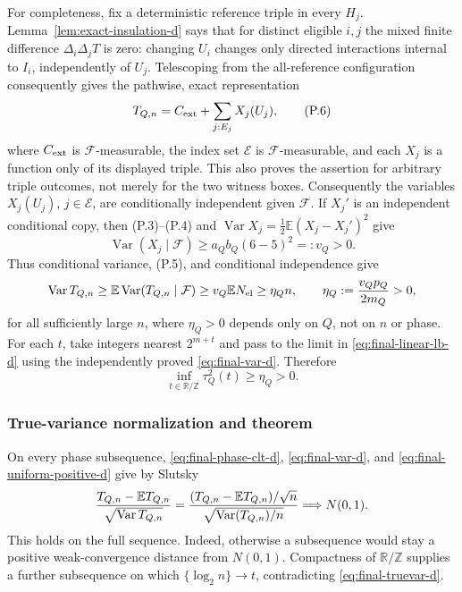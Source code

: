 \documentclass[11pt]{article}
\numberwithin{equation}{section}
\newcommand{\E}{\mathbb E}\newcommand{\Pp}{\mathbb P}
\newcommand{\Var}{\operatorname{Var}}\newcommand{\Cov}{\operatorname{Cov}}
\newcommand{\1}{\mathbf 1}\newcommand{\F}{\mathcal F}\newcommand{\D}{\mathcal D}
\begin{document}
For completeness, fix a deterministic reference triple in every $H_j$.
Lemma~\ref{lem:exact-insulation-d} says that for distinct eligible $i,j$ the
mixed finite difference $\Delta_i\Delta_jT$ is zero: changing $U_i$ changes
only directed interactions internal to $I_i$, independently of $U_j$.
Telescoping from the all-reference configuration consequently gives the
pathwise, exact representation
\begin{equation}
 T_{Q,n}=C_{\rm ext}+\sum_{j:E_j}X_j(U_j),              \tag{P.6}
\end{equation}
where $C_{\rm ext}$ is $\mathcal F$-measurable, the index set
$\mathcal E$ is $\mathcal F$-measurable, and each $X_j$ is a function only
of its displayed triple.  This also proves the assertion for arbitrary
triple outcomes, not merely for the two witness boxes.  Consequently the variables $X_j(U_j)$, $j\in\mathcal E$, are conditionally independent given $\mathcal F$.  If $X_j'$ is an independent conditional copy,
then (P.3)--(P.4) and
$\Var X_j=\frac12\E(X_j-X_j')^2$ give
\[
 \Var(X_j\mid\mathcal F)\ge a_Qb_Q(6-5)^2=:v_Q>0.      \tag{P.7}
\]
Thus conditional variance, (P.5), and conditional independence give
\begin{equation}
 \Var T_{Q,n}\ge\E\Var(T_{Q,n}\mid\mathcal F)
 \ge v_Q\E N_{\rm el}\ge\eta_Qn,\qquad
 \eta_Q:={v_Qp_Q\over2m_Q}>0,                          \label{eq:final-linear-lb-d}
\end{equation}
for all sufficiently large $n$, where $\eta_Q>0$ depends only on $Q$, not
on $n$ or phase.  For each $t$, take integers nearest $2^{m+t}$ and pass to
the limit in \eqref{eq:final-linear-lb-d} using the independently proved
\eqref{eq:final-var-d}.  Therefore
\begin{equation}\inf_{t\in\mathbb R/\mathbb Z}\tau_Q^2(t)\ge\eta_Q>0.
                                                               \label{eq:final-uniform-positive-d}
\end{equation}

\subsubsection{True-variance normalization and theorem}
On every phase subsequence, \eqref{eq:final-phase-clt-d},
\eqref{eq:final-var-d}, and \eqref{eq:final-uniform-positive-d} give by
Slutsky
\begin{equation}
 {T_{Q,n}-\E T_{Q,n}\over\sqrt{\Var T_{Q,n}}}
 ={{(T_{Q,n}-\E T_{Q,n})}/{\sqrt n}
    \over\sqrt{\Var(T_{Q,n})/n}}\Longrightarrow N(0,1). \label{eq:final-truevar-d}
\end{equation}
This holds on the full sequence.  Indeed, otherwise a subsequence would
stay a positive weak-convergence distance from $N(0,1)$.  Compactness of
$\mathbb R/\mathbb Z$ supplies a further subsequence on which
$\{\log_2n\}\to t$, contradicting \eqref{eq:final-truevar-d}.
\end{document}
